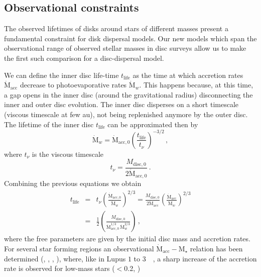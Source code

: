 \documentclass[usenatbib,useAMS,usedcolumn]{mnras}
\begin{document}
\subsection{Observational constraints}
The observed lifetimes of disks around stars of different masses present a fundamental constraint for disk dispersal models. Our new models which span the observational range of observed stellar masses in disc surveys allow us to make the first such comparison for a disc-dispersal model.

We can define the inner disc life-time $t_\mathrm{life}$ as the time at which accretion rates $\dot{\mathrm{M}}_\mathrm{acc}$ decrease to photoevaporative rates $\dot{\mathrm{M}}_w$.
This happens because, at this time, a gap opens in the inner disc (around the gravitational radius) disconnecting the inner and outer disc evolution. 
The inner disc disperses on a short timescale (viscous timescale at few \si{\astronomicalunit}), not being replenished anymore by the outer disc.
The lifetime of the inner disc $t_\mathrm{life}$ can be approximated then by
\begin{equation}\label{eq:tlifedef}
    \dot{\mathrm{M}}_w = \dot{\mathrm{M}}_\mathrm{acc,0}\left(\frac{t_\mathrm{life}}{t_\nu}\right)^{-3/2}\, ,
\end{equation}
where $t_\nu$ is the viscous timescale
\begin{equation}
    t_\nu = \frac{M_\mathrm{disc,0}}{2 \dot{\mathrm{M}}_\mathrm{acc,0}}\, .
\end{equation}
Combining the previous equations we obtain
\begin{eqnarray}\label{eq:tlife}
    t_\mathrm{life} &=& t_\nu \left(\frac{\dot{\mathrm{M}}_\mathrm{acc,0}}{\dot{\mathrm{M}}_w}\right)^{2/3} = \frac{M_\mathrm{disc,0}}{2 \dot{\mathrm{M}}_\mathrm{acc}}\left(\frac{\dot{\mathrm{M}}_\mathrm{acc}}{\dot{\mathrm{M}}_w}\right)^{2/3} \nonumber \\
    &=& \frac{1}{2}\left(\frac{M_\mathrm{disc,0}}{\dot{\mathrm{M}}_\mathrm{acc,0}^{1/3}\,\dot{\mathrm{M}}_w^{2/3}}\right)\, ,
\end{eqnarray}
where the free parameters are given by the initial disc mass and accretion rates.
For several star forming regions an observational $\dot{\mathrm{M}}_\mathrm{acc}-\mathrm{M}_\star$ relation has been determined (, , , ), where, like in Lupus $1$ to \SI{3}{\mega\year}, a sharp increase of the accretion rate is observed for low-mass stars ($<$\SI{0.2}{\solarmass}, )
\end{document}
